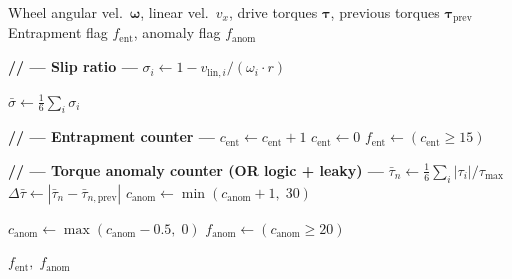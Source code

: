 \documentclass[conference]{IEEEtran}
\begin{document}
\begin{algorithm}[t]
  \caption{Dual-Mode Entrapment Detection}
  \label{alg:detection}
  \begin{algorithmic}[1]
    \Require Wheel angular vel.\ $\boldsymbol{\omega}$, linear vel.\ $v_x$,
             drive torques $\boldsymbol{\tau}$, previous torques
             $\boldsymbol{\tau}_\text{prev}$
    \Ensure  Entrapment flag $f_\text{ent}$, anomaly flag $f_\text{anom}$

    \State \textbf{// --- Slip ratio ---}
      \State $\sigma_i \gets 1 - v_{\text{lin},i} / (\omega_i \cdot r)$
    \EndFor
    
    \State $\bar{\sigma} \gets \tfrac{1}{6}\sum_i \sigma_i$

    \State \textbf{// --- Entrapment counter ---}
      \State $c_\text{ent} \gets c_\text{ent} + 1$
    \Else
      \State $c_\text{ent} \gets 0$
    \EndIf
    \State $f_\text{ent} \gets (c_\text{ent} \geq 15)$

    \State \textbf{// --- Torque anomaly counter (OR logic + leaky) ---}
    \State $\bar{\tau}_n     \gets \tfrac{1}{6}\sum_i|\tau_i|/\tau_\text{max}$
    \State $\Delta\bar{\tau} \gets |\bar{\tau}_n - \bar{\tau}_{n,\text{prev}}|$
      \State $c_\text{anom} \gets \min(c_\text{anom} + 1,\; 30)$
  
    \Else
      \State $c_\text{anom} \gets \max(c_\text{anom} - 0.5,\; 0)$
    \EndIf
    \State $f_\text{anom} \gets (c_\text{anom} \geq 20)$

    \State \Return $f_\text{ent},\; f_\text{anom}$
  \end{algorithmic}
\end{algorithm}
\end{document}
